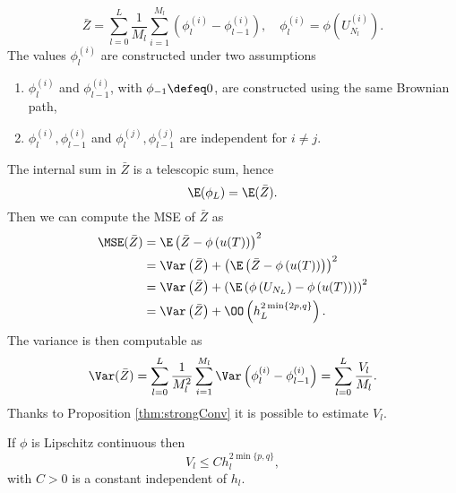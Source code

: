 \begin{equation}
	\bar Z = \sum_{l=0}^L \frac{1}{M_l} \sum_{i = 1}^{M_l}\left( \phi_l^{(i)} - \phi_{l-1}^{(i)} \right), \quad \phi_{l}^{(i)} = \phi \left(U_{N_l}^{(i)}\right).
\end{equation}
The values $\phi_l^{(i)}$ are constructed under two assumptions
\begin{enumerate}
	\item $\phi_l^{(i)}$ and $\phi_{l-1}^{(i)}$, with $\phi_{-1} \defeq 0$, are constructed using the same Brownian path,
	\item $\phi_l^{(i)}, \phi_{l-1}^{(i)}$ and $\phi_l^{(j)}, \phi_{l-1}^{(j)}$ are independent for $i \neq j$.
\end{enumerate}
The internal sum in $\bar Z$ is a telescopic sum, hence
\begin{equation}
	\E(\phi_L) = \E(\bar Z).
\end{equation}
Then we can compute the MSE of $\bar Z$ as
\begin{equation}
\begin{aligned}
	\MSE(\bar Z) &= \E\left(\bar Z - \phi\left(u(T)\right)\right)^2 \\
	&= \Var\left(\bar Z\right) + \left(\E\left(\bar Z - \phi\left(u(T)\right)\right)\right)^2 \\
	&= \Var\left(\bar Z\right) + \left(\E\left(\phi\left(U_{N_L}\right) - \phi\left(u(T)\right)\right)\right)^2 \\
	&= \Var\left(\bar Z\right) + \OO \left(h_L^{2\min\{2p, q\}}\right).
\end{aligned}
\end{equation}
The variance is then computable as
\begin{equation}
	\Var(\bar Z) = \sum_{l=0}^L \frac{1}{M_l^2} \sum_{i=1}^{M_l} \Var\left( \phi_l^{(i)} - \phi_{l-1}^{(i)} \right) = \sum_{l=0}^L \frac{V_l}{M_l}.
\end{equation}
Thanks to Proposition \ref{thm:strongConv} it is possible to estimate $V_l$.
\begin{lemma} If $\phi$ is Lipschitz continuous then 
\begin{equation}
	 V_l \leq C h_l^{2\min\{p, q\}},
\end{equation}
with $C > 0$ is a constant independent of $h_l$.
\end{lemma}
